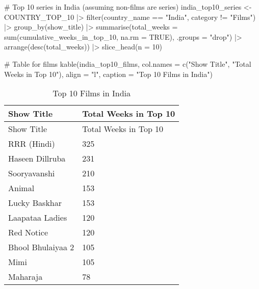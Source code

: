 \documentclass[
  12pt,
  letterpaper,
  DIV=11,
  numbers=noendperiod]{scrartcl}
\newenvironment{Shaded}{\begin{snugshade}}{\end{snugshade}}
\newcommand{\AttributeTok}[1]{\textcolor[rgb]{0.40,0.45,0.13}{#1}}
\newcommand{\CommentTok}[1]{\textcolor[rgb]{0.37,0.37,0.37}{#1}}
\newcommand{\ConstantTok}[1]{\textcolor[rgb]{0.56,0.35,0.01}{#1}}
\newcommand{\DecValTok}[1]{\textcolor[rgb]{0.68,0.00,0.00}{#1}}
\newcommand{\FunctionTok}[1]{\textcolor[rgb]{0.28,0.35,0.67}{#1}}
\newcommand{\NormalTok}[1]{\textcolor[rgb]{0.00,0.23,0.31}{#1}}
\newcommand{\OtherTok}[1]{\textcolor[rgb]{0.00,0.23,0.31}{#1}}
\newcommand{\SpecialCharTok}[1]{\textcolor[rgb]{0.37,0.37,0.37}{#1}}
\newcommand{\StringTok}[1]{\textcolor[rgb]{0.13,0.47,0.30}{#1}}
\begin{document}
\begin{Shaded}
\begin{Highlighting}[]
\CommentTok{\# Top 10 series in India (assuming non{-}films are series)}
\NormalTok{india\_top10\_series }\OtherTok{\textless{}{-}}\NormalTok{ COUNTRY\_TOP\_10 }\SpecialCharTok{|\textgreater{}}
  \FunctionTok{filter}\NormalTok{(country\_name }\SpecialCharTok{==} \StringTok{"India"}\NormalTok{, category }\SpecialCharTok{!=} \StringTok{"Films"}\NormalTok{) }\SpecialCharTok{|\textgreater{}}
  \FunctionTok{group\_by}\NormalTok{(show\_title) }\SpecialCharTok{|\textgreater{}}
  \FunctionTok{summarise}\NormalTok{(}\AttributeTok{total\_weeks =} \FunctionTok{sum}\NormalTok{(cumulative\_weeks\_in\_top\_10, }\AttributeTok{na.rm =} \ConstantTok{TRUE}\NormalTok{), }\AttributeTok{.groups =} \StringTok{"drop"}\NormalTok{) }\SpecialCharTok{|\textgreater{}}
  \FunctionTok{arrange}\NormalTok{(}\FunctionTok{desc}\NormalTok{(total\_weeks)) }\SpecialCharTok{|\textgreater{}}
  \FunctionTok{slice\_head}\NormalTok{(}\AttributeTok{n =} \DecValTok{10}\NormalTok{)}

\CommentTok{\# Table for films}
\FunctionTok{kable}\NormalTok{(india\_top10\_films, }\AttributeTok{col.names =} \FunctionTok{c}\NormalTok{(}\StringTok{"Show Title"}\NormalTok{, }\StringTok{"Total Weeks in Top 10"}\NormalTok{), }\AttributeTok{align =} \StringTok{"l"}\NormalTok{, }\AttributeTok{caption =} \StringTok{"Top 10 Films in India"}\NormalTok{)}
\end{Highlighting}
\end{Shaded}

\begin{longtable}[]{@{}ll@{}}
\caption{Top 10 Films in India}\tabularnewline
\toprule\noalign{}
Show Title & Total Weeks in Top 10 \\
\midrule\noalign{}
\endfirsthead
\toprule\noalign{}
Show Title & Total Weeks in Top 10 \\
\midrule\noalign{}
\endhead
\bottomrule\noalign{}
\endlastfoot
RRR (Hindi) & 325 \\
Haseen Dillruba & 231 \\
Sooryavanshi & 210 \\
Animal & 153 \\
Lucky Baskhar & 153 \\
Laapataa Ladies & 120 \\
Red Notice & 120 \\
Bhool Bhulaiyaa 2 & 105 \\
Mimi & 105 \\
Maharaja & 78 \\
\end{longtable}
\end{document}

